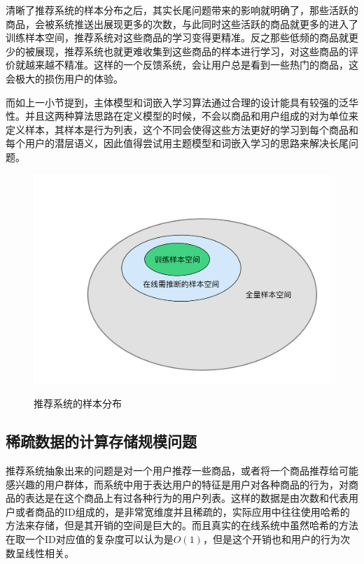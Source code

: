 清晰了推荐系统的样本分布之后，其实长尾问题带来的影响就明确了，那些活跃的商品，会被系统推送出展现更多的次数，与此同时这些活跃的商品就更多的进入了训练样本空间，推荐系统对这些商品的学习变得更精准。反之那些低频的商品就更少的被展现，推荐系统也就更难收集到这些商品的样本进行学习，对这些商品的评价就越来越不精准。这样的一个反馈系统，会让用户总是看到一些热门的商品，这会极大的损伤用户的体验。

而如上一小节提到，主体模型和词嵌入学习算法通过合理的设计能具有较强的泛华性。并且这两种算法思路在定义模型的时候，不会以商品和用户组成的对为单位来定义样本，其样本是行为列表，这个不同会使得这些方法更好的学习到每个商品和每个用户的潜层语义，因此值得尝试用主题模型和词嵌入学习的思路来解决长尾问题。
\begin{figure}[!h]
\centering
  \includegraphics[width=1.0\textwidth]{./graph/Sample.png}\\
  \caption{推荐系统的样本分布}
\label{fig:Sample}
\end{figure}

\subsection{稀疏数据的计算存储规模问题}
推荐系统抽象出来的问题是对一个用户推荐一些商品，或者将一个商品推荐给可能感兴趣的用户群体，而系统中用于表达用户的特征是用户对各种商品的行为，对商品的表达是在这个商品上有过各种行为的用户列表。这样的数据是由次数和代表用户或者商品的ID组成的，是非常宽维度并且稀疏的，实际应用中往往使用哈希的方法来存储，但是其开销的空间是巨大的。而且真实的在线系统中虽然哈希的方法在取一个ID对应值的复杂度可以认为是$O(1)$，但是这个开销也和用户的行为次数呈线性相关。


